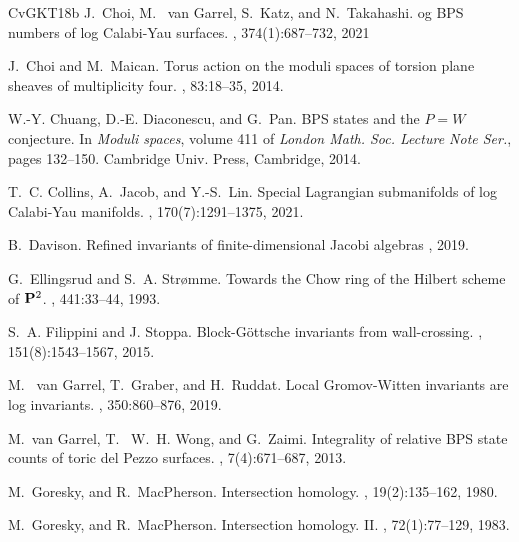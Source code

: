 \documentclass[11pt,letterpaper]{amsart}
\begin{document}
\begin{thebibliography}{CvGKT18b}
J.~Choi, M.~ van Garrel, S.~Katz, and N.~Takahashi.
og {BPS} numbers of log {C}alabi-{Y}au surfaces.
, 374(1):687--732, 2021

J.~Choi and M.~Maican.
\newblock Torus action on the moduli spaces of torsion plane sheaves of
  multiplicity four.
, 83:18--35, 2014.

W.-Y. Chuang, D.-E. Diaconescu, and G.~Pan.
\newblock B{PS} states and the {$P=W$} conjecture.
\newblock In {\em Moduli spaces}, volume 411 of {\em London Math. Soc. Lecture
  Note Ser.}, pages 132--150. Cambridge Univ. Press, Cambridge, 2014.


T.~C. Collins, A.~Jacob, and Y.-S.~Lin.
\newblock Special {L}agrangian submanifolds of log {C}alabi-{Y}au manifolds.
, 170(7):1291--1375, 2021.

B.~Davison. 
\newblock Refined invariants of finite-dimensional {J}acobi algebras
, 2019.

G.~Ellingsrud and S.~A. Str\o mme.
\newblock Towards the {C}how ring of the {H}ilbert scheme of {${\bf P}^2$}.
, 441:33--44, 1993.

S.~A. Filippini and J. Stoppa.
\newblock Block-{G}\"ottsche invariants from wall-crossing.
, 151(8):1543--1567, 2015.






M.~ van Garrel, T.~Graber, and H.~Ruddat.
\newblock Local {G}romov-{W}itten invariants are log invariants.
, 350:860--876, 2019.

M.~van Garrel, T.~ W.~H. Wong, and G.~Zaimi.
\newblock Integrality of relative {BPS} state counts of toric del {P}ezzo
  surfaces.
, 7(4):671--687, 2013.


 M.~Goresky, and R.~MacPherson.
\newblock Intersection homology.
, 19(2):135--162, 1980.



M.~Goresky, and R.~MacPherson.
\newblock Intersection homology. {II}.
,
72(1):77--129, 1983.



\end{thebibliography}
\end{document}
